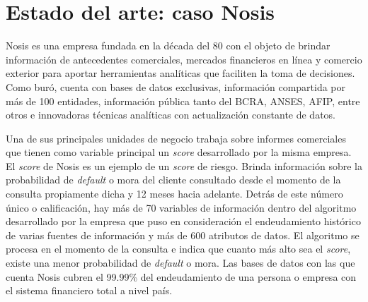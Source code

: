 




\section{Estado del arte: caso Nosis}

Nosis es una empresa fundada en la década del 80 con el objeto de brindar información de antecedentes comerciales, mercados financieros en línea y comercio exterior para aportar herramientas analíticas que faciliten la toma de decisiones.
Como buró, cuenta con bases de datos exclusivas, información compartida por más de 100 entidades, información pública tanto del BCRA, ANSES, AFIP, entre otros  e innovadoras técnicas analíticas con actualización constante de datos. 

Una de sus principales unidades de negocio trabaja sobre informes comerciales que tienen como variable principal un \textit{score} desarrollado por la misma empresa. 
El \textit{score} de Nosis es un ejemplo de un \textit{score} de riesgo. Brinda información sobre la probabilidad de \textit{default} o mora del cliente consultado desde el momento de la consulta propiamente dicha y 12 meses hacia adelante. Detrás de este número único o calificación, hay más de 70 variables de información dentro del algoritmo desarrollado por la empresa que puso en consideración el endeudamiento histórico de varias fuentes de información y más de 600 atributos de datos. El algoritmo se procesa en el momento de la consulta e indica que cuanto más alto sea el \textit{score}, existe una menor probabilidad de \textit{default} o mora.  
Las bases de datos con las que cuenta Nosis cubren el 99.99\% del endeudamiento de una persona o empresa con el sistema financiero total a nivel país. 

